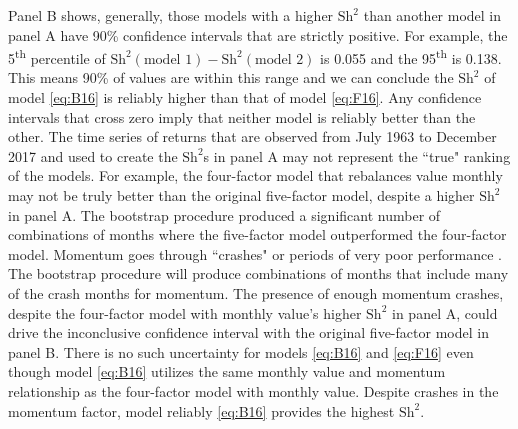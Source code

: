 Panel B shows, generally, those models with a higher $\text{Sh}^2$ than another
model in panel A have 90\% confidence intervals that are strictly positive.
For example, the 5\textsuperscript{th} percentile of
$\text{Sh}^2(\text{model 1})-\text{Sh}^2(\text{model 2})$ is 0.055 and the
95\textsuperscript{th} is 0.138.
This means 90\% of values are within this range and we
can conclude the $\text{Sh}^2$ of model \ref{eq:B16} is reliably higher
than that of model \ref{eq:F16}.
Any confidence intervals that cross zero imply that neither model is reliably
better than the other.
The time series of returns that are observed from July 1963 to December 2017
and used to create the $\text{Sh}^2$s in panel A may not represent the ``true"
ranking of the models.
For example, the four-factor model that rebalances value monthly may not be
truly better than the original five-factor model, despite a higher
$\text{Sh}^2$ in panel A.
The bootstrap procedure produced a significant number of combinations of months
where the five-factor model outperformed the four-factor model.
Momentum goes through ``crashes" or periods of very poor performance
\parencite{daniel2016momentum, barroso2015momentum}.
The bootstrap procedure will produce combinations of months that include
many of the crash months for momentum.
The presence of enough momentum crashes, despite the four-factor model with
monthly value's higher $\text{Sh}^2$ 
in panel A, could drive the inconclusive confidence interval with the original
five-factor model in panel B.
There is no such uncertainty for models \ref{eq:B16} and \ref{eq:F16}
even though model \ref{eq:B16} utilizes the same monthly value and momentum
relationship as the four-factor model with monthly value.
Despite crashes in the momentum factor, model reliably \ref{eq:B16} provides
the highest $\text{Sh}^2$.

